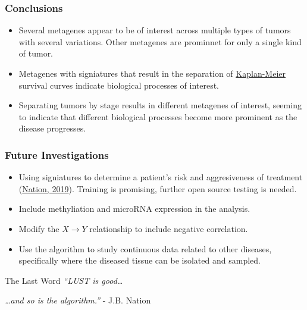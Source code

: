 \documentclass[
	11pt, %
]{beamer}
\begin{document}
\begin{frame}
    \frametitle{Conclusions}
    \begin{itemize}
        \item Several metagenes appear to be of interest across multiple types of tumors with several variations. Other metagenes are prominnet for only a single kind of tumor.
        \pause
        \item Metagenes with signiatures that result in the separation of \href{https://www.mygreatlearning.com/blog/kaplan-meier-curve-explained}{Kaplan-Meier} survival curves indicate biological processes of interest.
        \pause
        \item Separating tumors by stage results in different metagenes of interest, seeming to indicate that different biological processes become more prominent as the disease progresses.
    \end{itemize}
\end{frame}

\begin{frame}
    \frametitle{Future Investigations}
    \begin{itemize}
        \item Using signiatures to determine a patient's risk and aggresiveness of treatment (\href{https://github.com/tristanh314/lust-cancer-2019/blob/master/papers/melanoma_signature_2.pdf}{Nation, 2019}). Training is promising, further open source testing is needed.
        \pause
        \item Include methyliation and microRNA expression in the analysis.
        \pause
        \item Modify the $X \rightarrow Y$ relationship to include negative correlation.
        \pause
        \item Use the algorithm to study continuous data related to other diseases, specifically where the diseased tissue can be isolated and sampled.
    \end{itemize}
    \begin{block}{The Last Word}
        \emph{``LUST is good\ldots}
        \pause
        \smallskip

        \emph{\ldots and so is the algorithm.''} - J.B. Nation
    \end{block}
\end{frame}

\end{document}
